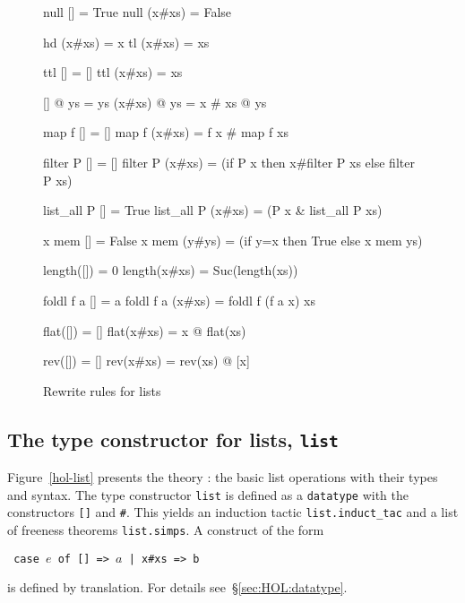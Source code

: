 \begin{figure}
\begin{ttbox}\makeatother
{}        null [] = True
       null (x#xs) = False

         hd (x#xs) = x
         tl (x#xs) = xs

         ttl [] = []
        ttl (x#xs) = xs

      [] @ ys = ys
     (x#xs) @ ys = x # xs @ ys

         map f [] = []
        map f (x#xs) = f x # map f xs

      filter P [] = []
     filter P (x#xs) = (if P x then x#filter P xs else filter P xs)

    list_all P [] = True
   list_all P (x#xs) = (P x & list_all P xs)

         x mem [] = False
        x mem (y#ys) = (if y=x then True else x mem ys)

      length([]) = 0
     length(x#xs) = Suc(length(xs))

       foldl f a [] = a
      foldl f a (x#xs) = foldl f (f a x) xs

        flat([]) = []
       flat(x#xs) = x @ flat(xs)

         rev([]) = []
        rev(x#xs) = rev(xs) @ [x]
\end{ttbox}
\caption{Rewrite rules for lists} \label{fig:HOL:list-simps}
\end{figure}


\subsection{The type constructor for lists, {\tt list}}

Figure~\ref{hol-list} presents the theory : the basic list
operations with their types and syntax. The type constructor {\tt list} is
defined as a {\tt datatype} with the constructors {\tt[]} and {\tt\#}.  This
yields an induction tactic {\tt list.induct_tac} and a list of freeness
theorems {\tt list.simps}.
A  construct of the form
\begin{center}\tt
case $e$ of [] => $a$  |  x\#xs => b
\end{center}
is defined by translation. For details see~\S\ref{sec:HOL:datatype}.

